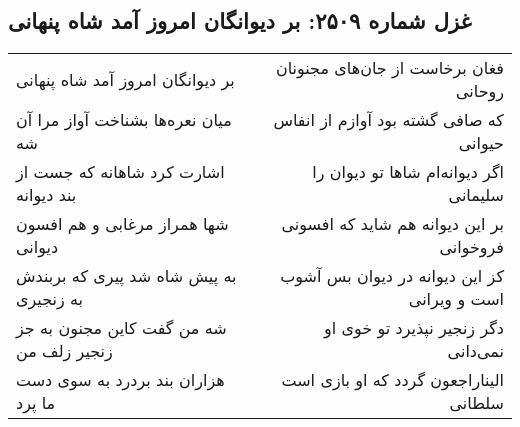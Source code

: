 \begin{center}
\section*{غزل شماره ۲۵۰۹: بر دیوانگان امروز آمد شاه پنهانی}
\label{sec:2509}
\begin{longtable}{l p{0.5cm} r}
بر دیوانگان امروز آمد شاه پنهانی
&&
فغان برخاست از جان‌های مجنونان روحانی
\\
میان نعره‌ها بشناخت آواز مرا آن شه
&&
که صافی گشته بود آوازم از انفاس حیوانی
\\
اشارت کرد شاهانه که جست از بند دیوانه
&&
اگر دیوانه‌ام شاها تو دیوان را سلیمانی
\\
شها همراز مرغابی و هم افسون دیوانی
&&
بر این دیوانه هم شاید که افسونی فروخوانی
\\
به پیش شاه شد پیری که بربندش به زنجیری
&&
کز این دیوانه در دیوان بس آشوب است و ویرانی
\\
شه من گفت کاین مجنون به جز زنجیر زلف من
&&
دگر زنجیر نپذیرد تو خوی او نمی‌دانی
\\
هزاران بند بردرد به سوی دست ما پرد
&&
الیناراجعون گردد که او بازی است سلطانی
\\
\end{longtable}
\end{center}
